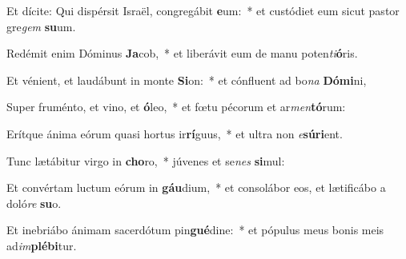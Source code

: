 \item Et dícite: Qui dispérsit Israël, congregábit \textbf{e}um:~* et custódiet eum sicut pastor gre\textit{gem} \textbf{su}um.
\item Redémit enim Dóminus \textbf{Ja}cob,~* et liberávit eum de manu poten\textit{ti}\textbf{ó}ris.
\item Et vénient, et laudábunt in monte \textbf{Si}on:~* et cónfluent ad bo\textit{na} \textbf{Dó}\textbf{mi}ni,
\item Super fruménto, et vino, et \textbf{ó}leo,~* et fœtu pécorum et ar\textit{men}\textbf{tó}rum:
\item Erítque ánima eórum quasi hortus ir\textbf{rí}guus,~* et ultra non \textit{e}\textbf{sú}\textbf{ri}ent.
\item Tunc lætábitur virgo in \textbf{cho}ro,~* júvenes et se\textit{nes} \textbf{si}mul:
\item Et convértam luctum eórum in \textbf{gáu}dium,~* et consolábor eos, et lætificábo a doló\textit{re} \textbf{su}o.
\item Et inebriábo ánimam sacerdótum pin\textbf{gué}dine:~* et pópulus meus bonis meis ad\textit{im}\textbf{plé}\textbf{bi}tur.
